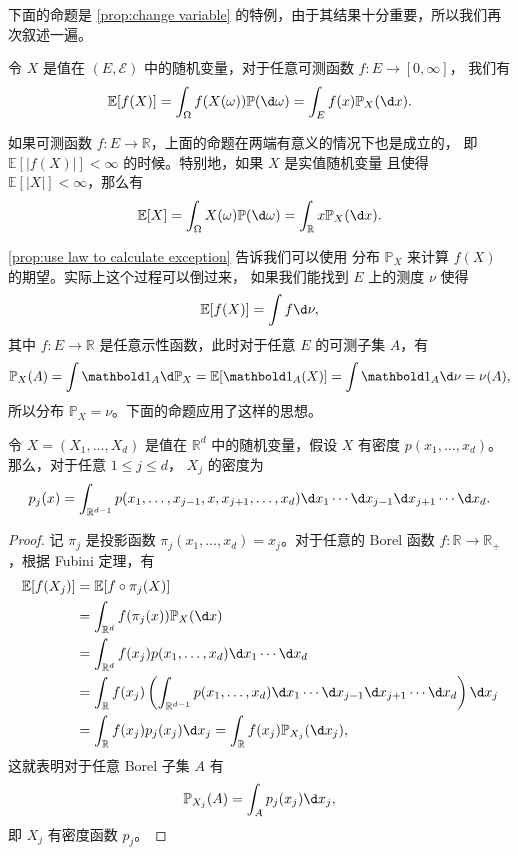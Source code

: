 \documentclass[fontset=none]{Notes}
\newcommand{\indicator}[1]{\mathbold 1_{#1}}
\begin{document}
下面的命题是 \autoref{prop:change variable} 的特例，由于其结果十分重要，所以我们再次叙述一遍。

\begin{proposition}\label{prop:use law to calculate exception}
  令 $X$ 是值在 $(E,\mathcal{E})$ 中的随机变量，对于任意可测函数 $f:E\to [0,\infty]$，
  我们有
  \[
    \mathbb{E}[f(X)]=\int_\Omega f(X(\omega)) \mathbb{P}(\d\omega)=\int_E f(x) \mathbb{P}_X(\d x).
  \]
\end{proposition}

如果可测函数 $f:E\to \mathbb{R}$，上面的命题在两端有意义的情况下也是成立的，
即 $\mathbb{E}[|f(X)|]<\infty$ 的时候。特别地，如果 $X$ 是实值随机变量
且使得 $\mathbb{E}[|X|]<\infty$，那么有
\[
  \mathbb{E}[X]  =\int_{\Omega} X(\omega)\mathbb{P}(\d\omega)
  =\int_{\mathbb{R}} x \mathbb{P}_X(\d x).
\]

\autoref{prop:use law to calculate exception} 告诉我们可以使用
分布 $\mathbb{P}_X$ 来计算 $f(X)$ 的期望。实际上这个过程可以倒过来，
如果我们能找到 $E$ 上的测度 $\nu$ 使得
\[
  \mathbb{E}[f(X)]=\int f\d\nu,  
\]
其中 $f:E\to \mathbb{R}$ 是任意示性函数，此时对于任意
$E$ 的可测子集 $A$，有
\[
  \mathbb{P}_X(A)=\int \indicator{A} \d \mathbb{P}_X=\mathbb{E}[\indicator{A}(X)]=  \int \indicator{A}\d\nu=\nu(A),
\]
所以分布 $\mathbb{P}_X=\nu$。下面的命题应用了这样的思想。

\begin{proposition}\label{prop:margin pdf}
  令 $X=(X_1,\dots,X_d)$ 是值在 $\mathbb{R}^d$ 中的随机变量，假设
  $X$ 有密度 $p(x_1,\dots,x_d)$。那么，对于任意 $1\leq j\leq d$，
  $X_j$ 的密度为
  \[
    p_j(x)=\int_{\mathbb{R}^{d-1}}p(x_1,\dots,x_{j-1},x,x_{j+1},\dots,x_d)
    \d x_1\cdots \d x_{j-1}\d x_{j+1}\cdots \d x_d.  
  \]
\end{proposition}
\begin{proof}
  记 $\pi_j$ 是投影函数 $\pi_j(x_1,\dots,x_d)=x_j$。对于任意的
  Borel 函数 $f:\mathbb{R}\to \mathbb{R}_+$，根据 Fubini 定理，有
  \begin{align*}
    \mathbb{E}[f(X_j)]&=\mathbb{E}[f\circ\pi_j(X)]\\
    &=\int_{\mathbb{R}^d}f(\pi_j(x)) \mathbb{P}_X(\d x)\\
    &=\int_{\mathbb{R}^d}f(x_j)p(x_1,\dots,x_d) \d x_1\cdots\d x_d \\
    &=\int_{\mathbb{R}}f(x_j)\left(
      \int_{\mathbb{R}^{d-1}}p(x_1,\dots,x_d)\d x_1\cdots
      \d x_{j-1}\d x_{j+1}\cdots \d x_d
    \right)\d x_j\\
    &=\int_{\mathbb{R}}f(x_j)p_j(x_j)\d x_j
    =\int_{\mathbb{R}}f(x_j) \mathbb{P}_{X_j}(\d x_j),
  \end{align*}
  这就表明对于任意 Borel 子集 $A$ 有
  \[
    \mathbb{P}_{X_j}(A)=\int_A p_j(x_j)\d x_j,  
  \]
  即 $X_j$ 有密度函数 $p_j$。 
\end{proof}
\end{document}
